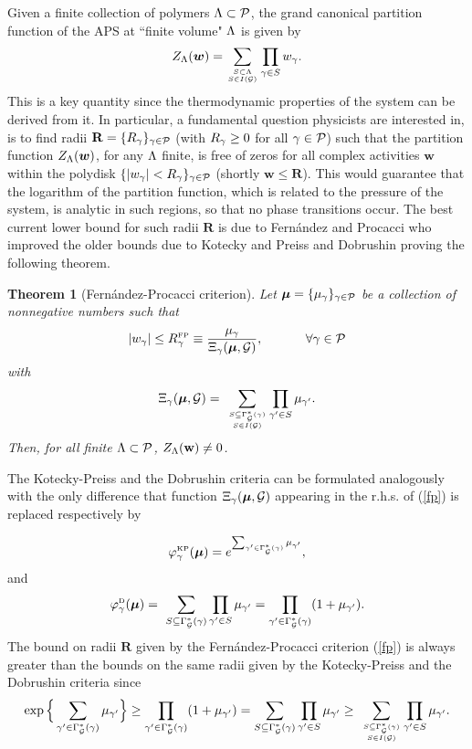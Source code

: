 \documentclass[11pt]{article}
\newtheorem{theo}{Theorem}[section]
\let\m=\mu \let\n=\nu \let\o=\omega    \let\p=\pi \let\ph=\varphi
\let\\=\noindent
\def\ee{\end{equation}}
\def\be{\begin{equation}}
\let\m=\mu \let\n=\nu \let\o=\omega    \let\p=\pi \let\ph=\varphi
\let\\=\noindent
\def\ee{\end{equation}}
\def\be{\begin{equation}}
\def\rfp{R^{\mbox{\tiny\rm FP}}}
\def\phd{\ph^{\mbox{\tiny\rm D}}}
\def\phkp{\ph^{\mbox{\tiny\rm KP}}}
\def\PP{{\mathcal P}}\def\EE{{\mathcal E}}
\def\GG{{\cal G}}
\begin{document}
\\Given a finite collection of polymers $\L\subset \PP$, the grand canonical partition function of the APS  at ``finite volume"  $\Lambda$
is given by
$$
Z_\L(\bm w)= \sum_{S \subset \L \atop S \in I(\GG)}{\prod_{\g \in S}{w_\g}}.
$$
This is a key quantity  since the thermodynamic properties of the system can be derived from it. In particular,
a fundamental question  physicists are interested in,  is
to find radii $\mathbf{R} = \{R_\g\}_{\g \in \PP}$ (with $R_\gamma\ge 0$ for all $\g\in \PP$) such that  the partition function  $Z_\Lambda(\bm w)$, for any $\Lambda$ finite,
is free of zeros  for all  complex activities $\bm w$ within the polydisk $\{|w_\g|<R_\g\}_{\g\in \PP}$ (shortly $\bm w\le \mathbf{ R}$).
This would guarantee that the logarithm of the partition function, which is related to the pressure of the system, is analytic in such regions, so that no phase transitions occur.
The best current lower bound for such radii $\mathbf{R}$ is   due to Fern\'andez and Procacci \cite{FP} who improved the older bounds
due to Kotecky and Preiss \cite{KP} and Dobrushin \cite{Do}  proving the following theorem.


\begin{theo}[Fern\'andez-Procacci criterion]\label{FPC}
Let $\bm\mu= \{\mu_\g\}_{\g \in \PP}$ be a collection of nonnegative numbers such that
 \be\label{fp}
 |w_\g| \leq \rfp_\g\equiv \frac{\mu_\g}{\Xi_\g(\bm \mu,\GG)},~~~~~~~~~~\forall \g\in \PP
 \ee
 with
\be\label{Xi}
\Xi_\g(\bm \mu,\GG)=~\sum_{S\subseteq\Gamma_\GG^*(\g)\atop S\in I(\GG) } \prod_{\g'\in S}\mu_{\g'}.
\ee
Then, for all finite $\L\subset \PP$, $Z_\Lambda(\mathbf{w})\neq 0$.
\end{theo}
The Kotecky-Preiss and the Dobrushin criteria can be formulated  analogously with the only difference that function $\Xi_\g(\bm \mu,\GG)$ appearing in the r.h.s. of (\ref{fp})
is replaced respectively  by

\be\label{Kope}
{\phkp_\g(\bm\mu)}=%
e^{\sum_{\g'\in \G^*_\GG(\g)}\m_{\g'}},
\ee
and
\be\label{Dobro}
{\phd_\g(\bm\mu)}=~\sum_{S\subseteq\Gamma^*_\GG(\g)} \prod_{\g'\in S}\mu_{\g'}=\prod_{\g'\in \G^*_\GG(\g)}(1+\m_{\g'}).
\ee
The bound on radii $\mathbf{R}$ given by the Fern\'andez-Procacci criterion (\ref{fp})
is always greater than the
bounds on the same radii  given by  the Kotecky-Preiss and the Dobrushin criteria since
$$
\exp\Big\{\sum_{\g'\in \G^*_\GG(\g)}\m_{\g'}\Big\}\ge \prod_{\g'\in \Gamma^*_\GG(\g)} (1+\mu_{\g'})= \sum\limits_{S\subseteq  \Gamma^*_\GG(\g)}
\prod_{\g'\in S}\mu_{\g'} \ge
~\sum_{S\subseteq\Gamma_\GG^*(\g)\atop S\in I(\GG) } \prod_{\g'\in S}\mu_{\g'}.
$$
\end{document}
